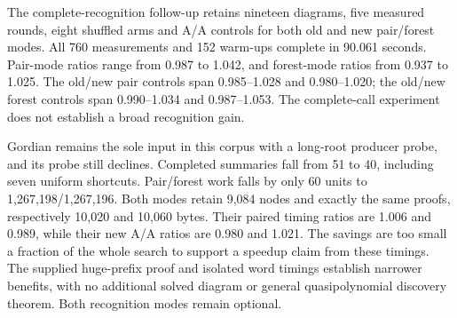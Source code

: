 

The complete-recognition follow-up retains nineteen diagrams, five measured
rounds, eight shuffled arms and A/A controls for both old and new pair/forest
modes. All 760 measurements and 152 warm-ups complete in 90.061 seconds.
Pair-mode ratios range from 0.987 to 1.042, and forest-mode ratios from
0.937 to 1.025. The old/new pair controls span 0.985--1.028 and 0.980--1.020;
the old/new forest controls span 0.990--1.034 and 0.987--1.053.
The complete-call experiment does not establish a broad recognition gain.

Gordian remains the sole input in this corpus with a long-root producer
probe, and its probe still declines. Completed summaries fall from 51
to 40, including seven uniform shortcuts. Pair/forest work falls by only
60 units to 1,267,198/1,267,196. Both modes retain 9,084 nodes and exactly
the same proofs, respectively 10,020 and 10,060 bytes. Their paired timing
ratios are 1.006 and 0.989, while their new A/A ratios are 0.980 and 1.021.
The savings are too small a fraction of the whole search to support a
speedup claim from these timings. The supplied huge-prefix proof and isolated
word timings establish narrower benefits, with no additional solved diagram
or general quasipolynomial discovery theorem. Both recognition modes remain
optional.
